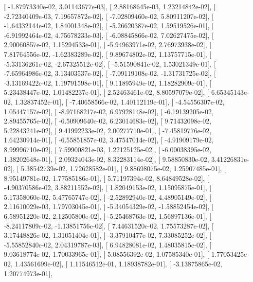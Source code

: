 \documentclass{article}
\begin{document}
       [ -1.87973340e-02,   3.01143677e-03],
       [  2.88168645e-03,   1.23214842e-02],
       [ -2.72340409e-03,   7.19657872e-02],
       [ -7.02809460e-02,   5.80911207e-02],
       [ -1.64332144e-02,   1.84001348e-02],
       [ -5.26620387e-02,   1.59519526e-01],
       [ -6.91992464e-02,   4.75678233e-03],
       [ -6.08845866e-02,   7.02627475e-02],
       [  2.90060857e-02,   1.15294533e-01],
       [ -5.94963971e-02,   2.76973938e-02],
       [  7.81764556e-02,  -1.62383289e-02],
       [  9.89674802e-02,   1.13757715e-01],
       [ -5.33136261e-02,  -2.67325512e-02],
       [ -5.51590841e-02,   1.53021349e-01],
       [ -7.65964986e-02,   3.13403537e-02],
       [ -7.09119108e-02,  -1.31731725e-02],
       [ -3.13169422e-02,   1.19791598e-01],
       [  9.11895949e-02,   1.18282909e-01],
       [  5.23438447e-02,   1.01482237e-01],
       [  2.52463461e-02,   8.80597079e-02],
       [  6.65345143e-02,   1.32837452e-01],
       [ -7.40658566e-02,   1.40112119e-01],
       [ -4.54556307e-02,   1.05447157e-02],
       [ -8.97168217e-02,   6.97928148e-02],
       [ -6.19139205e-02,   2.89455765e-02],
       [ -6.50909640e-02,   6.23014683e-02],
       [  9.71432098e-02,   5.22843241e-02],
       [  9.41992233e-02,   2.00277710e-01],
       [ -7.45819776e-02,   1.64230914e-01],
       [ -6.55851857e-02,   3.47547014e-02],
       [ -4.91909179e-02,   8.99996710e-02],
       [  7.59900821e-03,   1.22125125e-02],
       [ -6.00038395e-02,   1.38202648e-01],
       [  2.09324043e-02,   8.32283114e-02],
       [  9.58850830e-02,   3.41226831e-02],
       [  5.38542739e-02,   1.72628582e-01],
       [  9.88698075e-02,   1.25907485e-01],
       [  8.95149781e-02,   1.77585186e-01],
       [  5.71197394e-02,   8.64849528e-02],
       [ -4.90370586e-02,   3.88211552e-02],
       [  1.82049153e-02,   1.15095875e-01],
       [  5.17358060e-02,   5.47765747e-02],
       [ -2.52892940e-02,   4.48905149e-02],
       [  2.11610029e-03,   1.79703045e-01],
       [ -5.34054329e-02,  -1.58852454e-02],
       [  6.58951220e-02,   2.12505800e-02],
       [ -5.25468763e-02,   1.56897136e-01],
       [ -8.24117809e-02,  -1.13851756e-02],
       [  7.44631520e-02,   1.75573287e-02],
       [  3.17448826e-02,   1.31051404e-01],
       [ -3.37910477e-02,   7.33085252e-02],
       [ -5.55852840e-02,   2.04319787e-03],
       [  6.94828081e-02,   1.48035815e-02],
       [  9.03618774e-02,   1.70033965e-01],
       [  5.08556392e-02,   1.07585340e-01],
       [  1.77053425e-02,   1.43561699e-02],
       [  1.11546512e-01,   1.18938782e-01],
       [ -3.13875865e-02,   1.20774973e-01],
\end{document}
